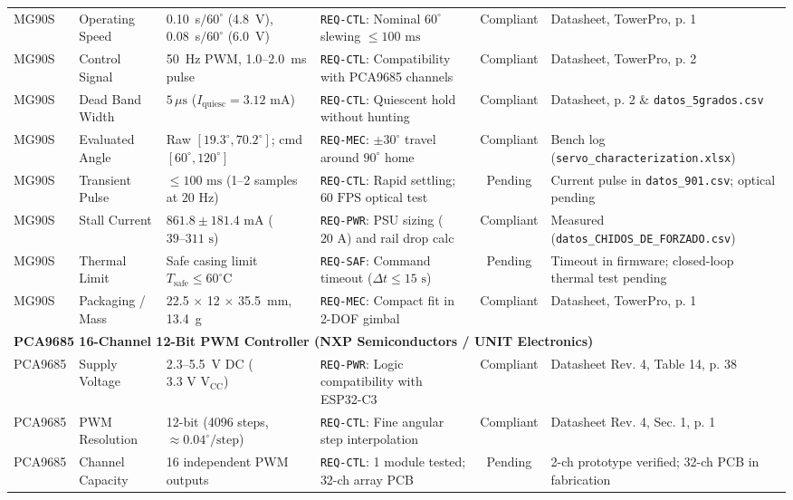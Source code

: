 \documentclass[lettersize,journal]{IEEEtran}
\begin{document}
\begin{table}[!t]
\begin{tabular}{p{1.9cm} p{2.6cm} p{3.1cm} p{3.7cm} c p{3.5cm}}
			MG90S & Operating Speed & 0.10~s$/60^\circ$ (4.8~V), 0.08~s$/60^\circ$ (6.0~V) & \texttt{REQ-CTL}: Nominal $60^\circ$ slewing $\le 100\text{ ms}$ & Compliant & Datasheet, TowerPro, p. 1 \\
			MG90S & Control Signal & 50~Hz PWM, 1.0--2.0~ms pulse & \texttt{REQ-CTL}: Compatibility with PCA9685 channels & Compliant & Datasheet, TowerPro, p. 2 \\
			MG90S & Dead Band Width & $5\,\mu\text{s}$ ($I_{\text{quiesc}} = 3.12\text{ mA}$) & \texttt{REQ-CTL}: Quiescent hold without hunting & Compliant & Datasheet, p. 2 \& \texttt{datos\_5grados.csv} \\
			MG90S & Evaluated Angle & Raw $[19.3^\circ, 70.2^\circ]$; cmd $[60^\circ, 120^\circ]$ & \texttt{REQ-MEC}: $\pm 30^\circ$ travel around $90^\circ$ home & Compliant & Bench log (\texttt{servo\_characterization.xlsx}) \\
			MG90S & Transient Pulse & $\le 100\text{ ms}$ (1--2 samples at $20\text{ Hz}$) & \texttt{REQ-CTL}: Rapid settling; $60\text{ FPS}$ optical test & Pending & Current pulse in \texttt{datos\_901.csv}; optical pending \\
			MG90S & Stall Current & $861.8 \pm 181.4\text{ mA}$ ($39\text{--}311\text{ s}$) & \texttt{REQ-PWR}: PSU sizing ($20\text{ A}$) and rail drop calc & Compliant & Measured (\texttt{datos\_CHIDOS\_DE\_FORZADO.csv}) \\
			MG90S & Thermal Limit & Safe casing limit $T_{\text{safe}} \le 60^\circ\text{C}$ & \texttt{REQ-SAF}: Command timeout ($\Delta t \le 15\text{ s}$) & Pending & Timeout in firmware; closed-loop thermal test pending \\
			MG90S & Packaging / Mass & 22.5 $\times$ 12 $\times$ 35.5~mm, 13.4~g & \texttt{REQ-MEC}: Compact fit in 2-DOF gimbal & Compliant & Datasheet, TowerPro, p. 1 \\
			\midrule
			\multicolumn{6}{l}{\textbf{PCA9685 16-Channel 12-Bit PWM Controller (NXP Semiconductors / UNIT Electronics)}} \\
			PCA9685 & Supply Voltage & 2.3--5.5~V DC ($3.3\text{ V }\text{V}_{\text{CC}}$) & \texttt{REQ-PWR}: Logic compatibility with ESP32-C3 & Compliant & Datasheet Rev. 4, Table 14, p. 38 \\
			PCA9685 & PWM Resolution & 12-bit (4096 steps, $\approx 0.04^\circ/\text{step}$) & \texttt{REQ-CTL}: Fine angular step interpolation & Compliant & Datasheet Rev. 4, Sec. 1, p. 1 \\
			PCA9685 & Channel Capacity & 16 independent PWM outputs & \texttt{REQ-CTL}: 1 module tested; 32-ch array PCB & Pending & 2-ch prototype verified; 32-ch PCB in fabrication \\

\end{tabular}
\end{table}
\end{document}
